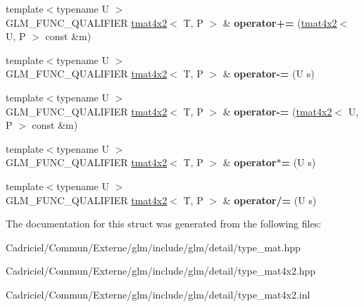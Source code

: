 \begin{DoxyCompactItemize}
\item 
{\footnotesize template$<$typename U $>$ }\\G\+L\+M\+\_\+\+F\+U\+N\+C\+\_\+\+Q\+U\+A\+L\+I\+F\+I\+ER \hyperlink{structglm_1_1detail_1_1tmat4x2}{tmat4x2}$<$ T, P $>$ \& {\bfseries operator+=} (\hyperlink{structglm_1_1detail_1_1tmat4x2}{tmat4x2}$<$ U, P $>$ const \&m)\hypertarget{structglm_1_1detail_1_1tmat4x2_a39682439b0540114d8a90dfb96ff09e7}{}\label{structglm_1_1detail_1_1tmat4x2_a39682439b0540114d8a90dfb96ff09e7}

\item 
{\footnotesize template$<$typename U $>$ }\\G\+L\+M\+\_\+\+F\+U\+N\+C\+\_\+\+Q\+U\+A\+L\+I\+F\+I\+ER \hyperlink{structglm_1_1detail_1_1tmat4x2}{tmat4x2}$<$ T, P $>$ \& {\bfseries operator-\/=} (U s)\hypertarget{structglm_1_1detail_1_1tmat4x2_a1e70f82c8238bde1d32bb4398464079c}{}\label{structglm_1_1detail_1_1tmat4x2_a1e70f82c8238bde1d32bb4398464079c}

\item 
{\footnotesize template$<$typename U $>$ }\\G\+L\+M\+\_\+\+F\+U\+N\+C\+\_\+\+Q\+U\+A\+L\+I\+F\+I\+ER \hyperlink{structglm_1_1detail_1_1tmat4x2}{tmat4x2}$<$ T, P $>$ \& {\bfseries operator-\/=} (\hyperlink{structglm_1_1detail_1_1tmat4x2}{tmat4x2}$<$ U, P $>$ const \&m)\hypertarget{structglm_1_1detail_1_1tmat4x2_a85080df35d7d859072e4bdcd955747d5}{}\label{structglm_1_1detail_1_1tmat4x2_a85080df35d7d859072e4bdcd955747d5}

\item 
{\footnotesize template$<$typename U $>$ }\\G\+L\+M\+\_\+\+F\+U\+N\+C\+\_\+\+Q\+U\+A\+L\+I\+F\+I\+ER \hyperlink{structglm_1_1detail_1_1tmat4x2}{tmat4x2}$<$ T, P $>$ \& {\bfseries operator$\ast$=} (U s)\hypertarget{structglm_1_1detail_1_1tmat4x2_a2fc51001f24270fc2c93b824668678ad}{}\label{structglm_1_1detail_1_1tmat4x2_a2fc51001f24270fc2c93b824668678ad}

\item 
{\footnotesize template$<$typename U $>$ }\\G\+L\+M\+\_\+\+F\+U\+N\+C\+\_\+\+Q\+U\+A\+L\+I\+F\+I\+ER \hyperlink{structglm_1_1detail_1_1tmat4x2}{tmat4x2}$<$ T, P $>$ \& {\bfseries operator/=} (U s)\hypertarget{structglm_1_1detail_1_1tmat4x2_acfd79479bd1ebfb4a6c7c654d0648a5b}{}\label{structglm_1_1detail_1_1tmat4x2_acfd79479bd1ebfb4a6c7c654d0648a5b}

\end{DoxyCompactItemize}


The documentation for this struct was generated from the following files\+:\begin{DoxyCompactItemize}
\item 
Cadriciel/\+Commun/\+Externe/glm/include/glm/detail/type\+\_\+mat.\+hpp\item 
Cadriciel/\+Commun/\+Externe/glm/include/glm/detail/type\+\_\+mat4x2.\+hpp\item 
Cadriciel/\+Commun/\+Externe/glm/include/glm/detail/type\+\_\+mat4x2.\+inl\end{DoxyCompactItemize}
